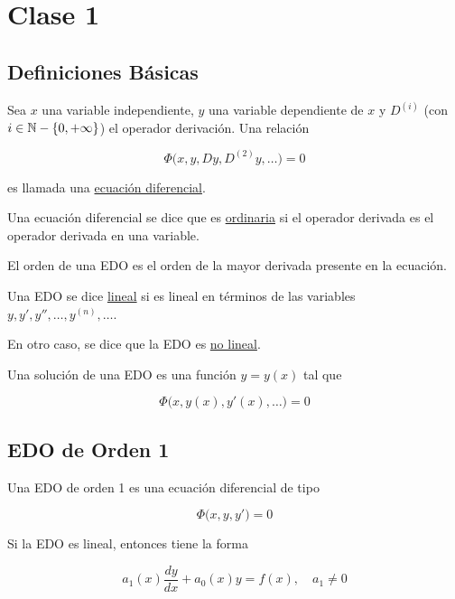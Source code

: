 \section*{Clase 1}

\subsection*{Definiciones Básicas}

\begin{defn}
    Sea $x$ una variable independiente, $y$ una variable dependiente de $x$ y $D^{(i)}$ (con $i \in \mathbb{N} - \{0, +\infty\}$) el operador derivación. Una relación
    
    \[
    \Phi\big( x, y, Dy, D^{(2)}y, \dots \big) = 0
    \]

    es llamada una \ul{ecuación diferencial}.

    Una ecuación diferencial se dice que es \ul{ordinaria} si el operador derivada es el operador derivada en una variable.
\end{defn}

\begin{defn}
    El orden de una EDO es el orden de la mayor derivada presente en la ecuación.
\end{defn}

\begin{defn}
    Una EDO se dice \ul{lineal} si es lineal en términos de las variables $y, y', y'', \dots, y^{(n)}, \dots$.

    En otro caso, se dice que la EDO es \ul{no lineal}.
\end{defn}

\begin{defn}
    Una solución de una EDO es una función $y = y(x)$ tal que

    \[
    \Phi\big( x, y(x), y'(x), \dots \big) = 0
    \]
\end{defn}

\subsection*{EDO de Orden 1}

\begin{defn}
    Una EDO de orden 1 es una ecuación diferencial de tipo

    \[
    \Phi\big( x, y, y' \big) = 0
    \]

    Si la EDO es lineal, entonces tiene la forma

    \[
    a_1(x)\frac{dy}{dx} + a_0(x)y = f(x), \quad a_1 \neq 0
    \]
\end{defn}

